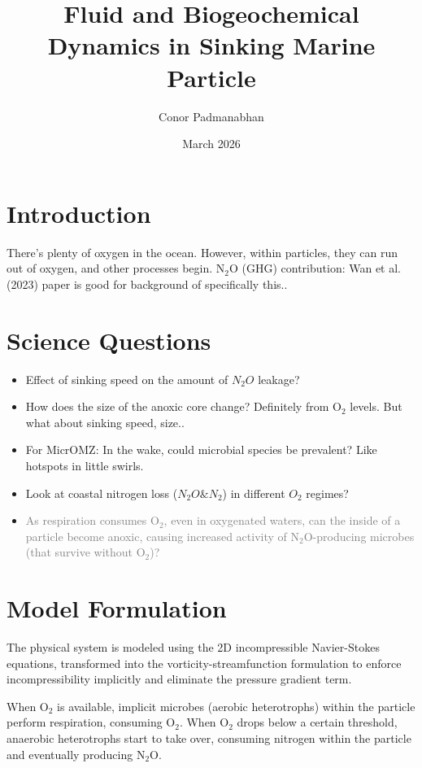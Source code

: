 \documentclass{article}
\begin{document}
\title{Fluid and Biogeochemical Dynamics in Sinking Marine Particle}
\author{Conor Padmanabhan}
\date{March 2026}


\maketitle

\tableofcontents

\section{Introduction}

There's plenty of oxygen in the ocean. However, within particles, they can run out of oxygen, and other processes begin. N$_2$O (GHG) contribution: Wan et al. (2023) paper is good for background of specifically this..


\section{Science Questions}
\begin{itemize}
    \item Effect of sinking speed on the amount of $N_2 O$ leakage?
    \item How does the size of the anoxic core change? Definitely from O$_2$ levels. But what about sinking speed, size..
    \item For MicrOMZ: In the wake, could microbial species be prevalent? Like hotspots in little swirls.
    \item Look at coastal nitrogen loss ($N_2 O \& N_2$) in different $O_2$ regimes?
    \item \textcolor{gray}{As respiration consumes O$_2$, even in oxygenated waters, can the inside of a particle become anoxic, causing increased activity of N$_2$O-producing microbes (that survive without O$_2$)?}
\end{itemize}


\section{Model Formulation}
The physical system is modeled using the 2D incompressible Navier-Stokes equations, transformed into the vorticity-streamfunction formulation to enforce incompressibility implicitly and eliminate the pressure gradient term.

When O$_2$ is available, implicit microbes (aerobic heterotrophs) within the particle perform respiration, consuming O$_2$. When O$_2$ drops below a certain threshold, anaerobic heterotrophs start to take over, consuming nitrogen within the particle and eventually producing N$_2$O.
\end{document}
